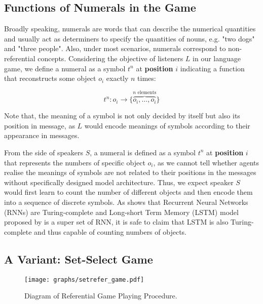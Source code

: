 \subsection{Functions of Numerals in the Game}
\label{ssec3.1.2:numeral_in_game}

Broadly speaking, numerals are words that can describe the numerical quantities and usually act as determiners to specify the quantities of nouns, e.g. "two dogs" and "three people". Also, under most scenarios, numerals correspond to non-referential concepts\cite{da2016wow}. Considering the objective of listeners $L$ in our language game, we define a numeral as a symbol $t^n$ at \textbf{position} $i$ indicating a function that reconstructs some object $o_i$ exactly $n$ times:

\begin{equation}
  t^n: o_i \rightarrow \{\overbrace{o_i, \dots, o_i}^{n \mbox{ elements}}\}
  \label{eq:3.1numeral_define}
\end{equation}

Note that, the meaning of a symbol is not only decided by itself but also its position in message, as $L$ would encode meanings of symbols according to their appearance in messages.

From the side of speakers $S$, a numeral is defined as a symbol $t^n$ at \textbf{position} $i$ that represents the numbers of specific object $o_i$, as we cannot tell whether agents realise the meanings of symbols are not related to their positions in the messages without specifically designed model architecture. Thus, we expect speaker $S$ would first learn to count the number of different objects and then encode them into a sequence of discrete symbols. As \cite{Siegelmann1992NN} shows that Recurrent Neural Networks (RNNs) are Turing-complete and Long-short Term Memory (LSTM) model proposed by \cite{hochreiter1997long} is a super set of RNN, it is safe to claim that LSTM is also Turing-complete and thus capable of counting numbers of objects.

\subsection{A Variant: Set-Select Game}
\label{ssec:3.1.3:refer_game}

\begin{figure}[!h]
  \centering
  \texttt{[image: graphs/setrefer\_game.pdf]}
  \caption{Diagram of Referential Game Playing Procedure.}
  \label{fig3:refer_game_procedure}
\end{figure}

